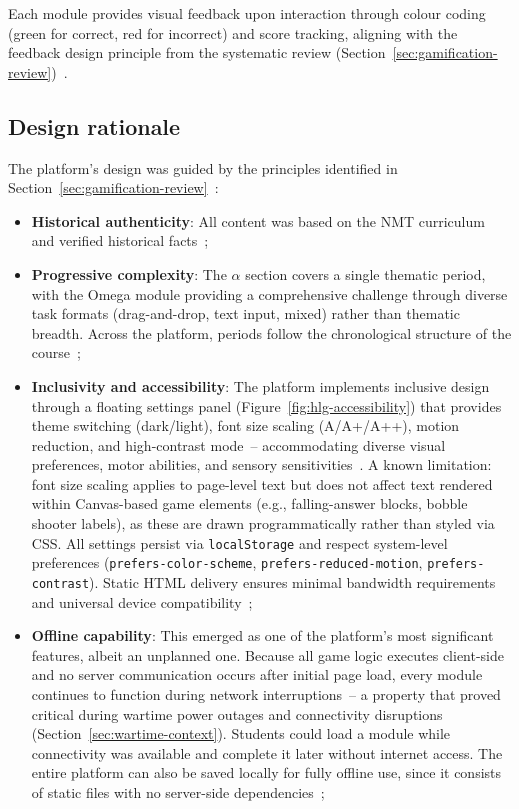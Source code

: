Each module provides visual feedback upon interaction through colour coding (green for correct, red for incorrect) and score tracking, aligning with the feedback design principle from the systematic review (Section~\ref{sec:gamification-review})~\cite{KorniienkoSemerikov2024, Hattie2009}.

\subsection{Design rationale}

The platform's design was guided by the principles identified in Section~\ref{sec:gamification-review}~\cite{KorniienkoSemerikov2024, Korniienko2025aredu}:

\begin{itemize}
\item \textbf{Historical authenticity}: All content was based on the NMT curriculum and verified historical facts~\cite{KorniienkoSemerikov2024, Christiansson200593};
\item \textbf{Progressive complexity}: The $\alpha$ section covers a single thematic period, with the Omega module providing a comprehensive challenge through diverse task formats (drag-and-drop, text input, mixed) rather than thematic breadth. Across the platform, periods follow the chronological structure of the course~\cite{Clark2016, Hamari2014, Laskowski2015};
\item \textbf{Inclusivity and accessibility}: The platform implements inclusive design through a floating settings panel (Figure~\ref{fig:hlg-accessibility}) that provides theme switching (dark/light), font size scaling (A/A+/A++), motion reduction, and high-contrast mode~-- accommodating diverse visual preferences, motor abilities, and sensory sensitivities~\cite{McCrindle2013}. A known limitation: font size scaling applies to page-level text but does not affect text rendered within Canvas-based game elements (e.g., falling-answer blocks, bobble shooter labels), as these are drawn programmatically rather than styled via CSS. All settings persist via \texttt{localStorage} and respect system-level preferences (\texttt{prefers-color-scheme}, \texttt{prefers-reduced-motion}, \texttt{prefers-contrast}). Static HTML delivery ensures minimal bandwidth requirements and universal device compatibility~\cite{Vuorikari2016, Zainuddin20241261};
\item \textbf{Offline capability}: This emerged as one of the platform's most significant features, albeit an unplanned one. Because all game logic executes client-side and no server communication occurs after initial page load, every module continues to function during network interruptions~-- a property that proved critical during wartime power outages and connectivity disruptions (Section~\ref{sec:wartime-context}). Students could load a module while connectivity was available and complete it later without internet access. The entire platform can also be saved locally for fully offline use, since it consists of static files with no server-side dependencies~\cite{Martynets202428, KorniienkoSemerikov2024};

\end{itemize}
